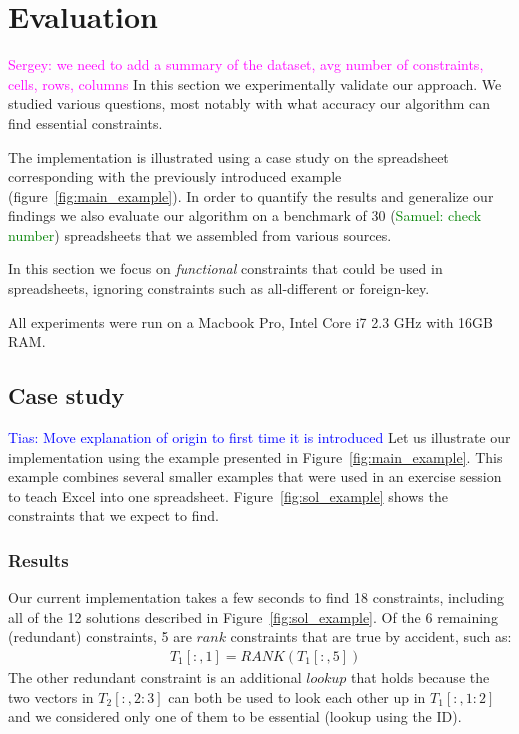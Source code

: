 \documentclass{IEEEtran}
\newcommand{\sergey}[1]{\textcolor{magenta}{{\sc Sergey:} #1}\xspace}
\newcommand{\samuel}[1]{\textcolor{green}{{\sc Samuel:} #1}\xspace}
\newcommand{\tias}[1]{\textcolor{blue}{{\sc Tias:} #1}\xspace}
\newcommand{\range}[3]{\ensuremath{#1[#2,#3]}}
\newcommand{\rangeto}[2]{#1{:}#2}
\newcommand{\rangeall}{:}
\newcommand{\eccalc}[2]{\ensuremath{#1 = #2}}
\newcommand{\ecrank}[2]{\eccalc{#1}{\textit{RANK}(#2)}}
\theoremstyle{definition}
\begin{document}

\newcommand{\runtotal}{16.12}
\newcommand{\runtotalstd}{0.62}

\newcommand{\runfile}{0.50}
\newcommand{\runfilestd}{0.02}

\section{Evaluation}\label{sec:evaluation}
\sergey{we need to add a summary of the dataset, avg number of constraints, cells, rows, columns}
In this section we experimentally validate our approach.
We studied various questions, most notably with what accuracy our algorithm can find essential constraints.

The implementation is illustrated using a case study on the spreadsheet corresponding with the previously introduced example (figure~\ref{fig:main_example}).
In order to quantify the results and generalize our findings we also evaluate our algorithm on a benchmark of 30 (\samuel{check number}) spreadsheets that we assembled from various sources.

In this section we focus on \textit{functional} constraints that could be used in spreadsheets, ignoring constraints such as all-different or foreign-key.

All experiments were run on a Macbook Pro, Intel Core i7 2.3 GHz with 16GB RAM.

\subsection{Case study}
\tias{Move explanation of origin to first time it is introduced}
Let us illustrate our implementation using the example presented in Figure~\ref{fig:main_example}.
This example combines several smaller examples that were used in an exercise session to teach Excel into one spreadsheet.
Figure~\ref{fig:sol_example} shows the constraints that we expect to find.

\subsubsection{Results}
Our current implementation takes a few seconds to find 18 constraints, including all of the 12 solutions described in Figure~\ref{fig:sol_example}.
Of the 6 remaining (redundant) constraints, 5 are $\mathit{rank}$ constraints that are true by accident, such as: \begin{align*}
  & \ecrank{\range{T_1}{\rangeall}{1}}{\range{T_1}{\rangeall}{5}}
\end{align*}
The other redundant constraint is an additional $\mathit{lookup}$ that holds because the two vectors in \range{T_2}{\rangeall}{\rangeto{2}{3}} can both be used to look each other up in \range{T_1}{\rangeall}{\rangeto{1}{2}} and we considered only one of them to be essential (lookup using the ID).
\end{document}
